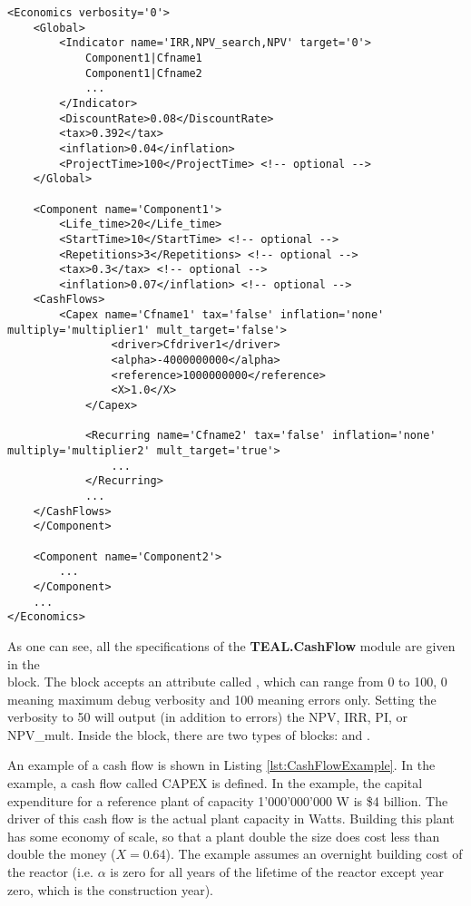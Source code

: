 \begin{lstlisting}[style=XML,morekeywords={anAttribute},caption=Economics input example., label=lst:InputExample]
<Economics verbosity='0'>
    <Global>
        <Indicator name='IRR,NPV_search,NPV' target='0'>
            Component1|Cfname1
            Component1|Cfname2
            ...
        </Indicator>
        <DiscountRate>0.08</DiscountRate>
        <tax>0.392</tax>
        <inflation>0.04</inflation>
        <ProjectTime>100</ProjectTime> <!-- optional -->
    </Global>

    <Component name='Component1'>
        <Life_time>20</Life_time>
        <StartTime>10</StartTime> <!-- optional -->
        <Repetitions>3</Repetitions> <!-- optional -->
        <tax>0.3</tax> <!-- optional -->
        <inflation>0.07</inflation> <!-- optional -->
	<CashFlows>
	    <Capex name='Cfname1' tax='false' inflation='none' multiply='multiplier1' mult_target='false'>
    	        <driver>Cfdriver1</driver>
                <alpha>-4000000000</alpha>
                <reference>1000000000</reference>
                <X>1.0</X>
            </Capex>

            <Recurring name='Cfname2' tax='false' inflation='none' multiply='multiplier2' mult_target='true'>
                ...
            </Recurring>
            ...
	</CashFlows>
    </Component>

    <Component name='Component2'>
        ...
    </Component>
    ...
</Economics>
\end{lstlisting}

As one can see, all the specifications of the \textbf{TEAL.CashFlow} module are given in the \\ block. The block accepts an attribute called ,
which can range from 0 to 100, 0 meaning maximum debug verbosity and 100 meaning
errors only. Setting the verbosity to 50 will output (in addition to errors) the
 NPV, IRR, PI, or NPV\_mult. Inside the  block, there are two
 types of blocks:  and .

An example of a cash flow is shown in Listing \ref{lst:CashFlowExample}. In the example, a cash flow called CAPEX is defined.
In the example, the capital expenditure for a reference plant of capacity
1'000'000'000 W is \$4 billion. The driver of this cash flow is the actual plant capacity in Watts. Building this plant has some economy
of scale, so that a plant double the size does cost
less than double the money ($X=0.64$). The example assumes an overnight building cost of the reactor (i.e. $\alpha$ is zero for
all years of the lifetime of the reactor except year zero, which is the construction year).

